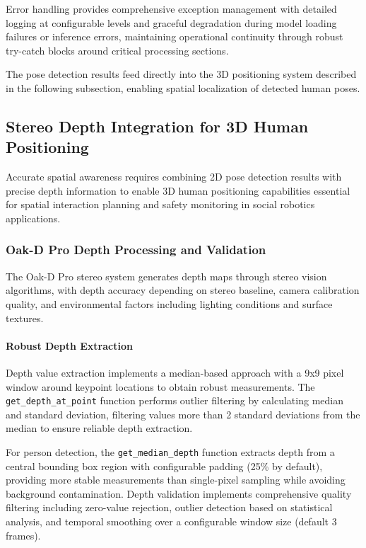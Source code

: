 Error handling provides comprehensive exception management with detailed logging at configurable levels and graceful degradation during model loading failures or inference errors, maintaining operational continuity through robust try-catch blocks around critical processing sections.

The pose detection results feed directly into the 3D positioning system described in the following subsection, enabling spatial localization of detected human poses.

\subsection{Stereo Depth Integration for 3D Human Positioning}

Accurate spatial awareness requires combining 2D pose detection results with precise depth information to enable 3D human positioning capabilities essential for spatial interaction planning and safety monitoring in social robotics applications.

\subsubsection{Oak-D Pro Depth Processing and Validation}

The Oak-D Pro stereo system generates depth maps through stereo vision algorithms, with depth accuracy depending on stereo baseline, camera calibration quality, and environmental factors including lighting conditions and surface textures.

\paragraph{Robust Depth Extraction}

Depth value extraction implements a median-based approach with a 9x9 pixel window around keypoint locations to obtain robust measurements. The \texttt{get\_depth\_at\_point} function performs outlier filtering by calculating median and standard deviation, filtering values more than 2 standard deviations from the median to ensure reliable depth extraction.

For person detection, the \texttt{get\_median\_depth} function extracts depth from a central bounding box region with configurable padding (25\% by default), providing more stable measurements than single-pixel sampling while avoiding background contamination. Depth validation implements comprehensive quality filtering including zero-value rejection, outlier detection based on statistical analysis, and temporal smoothing over a configurable window size (default 3 frames).

